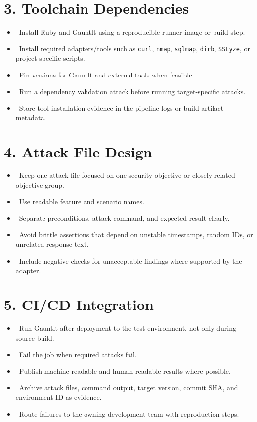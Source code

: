 \documentclass[11pt]{article}
\newcommand{\checkbox}{\raisebox{0.2ex}{\fbox{\rule{0pt}{0.9ex}\rule{0.9ex}{0pt}}}}
\begin{document}
\section{3. Toolchain Dependencies}
\begin{itemize}
  \item \checkbox\ Install Ruby and Gauntlt using a reproducible runner image or build step.
  \item \checkbox\ Install required adapters/tools such as \texttt{curl}, \texttt{nmap}, \texttt{sqlmap}, \texttt{dirb}, \texttt{SSLyze}, or project-specific scripts.
  \item \checkbox\ Pin versions for Gauntlt and external tools when feasible.
  \item \checkbox\ Run a dependency validation attack before running target-specific attacks.
  \item \checkbox\ Store tool installation evidence in the pipeline logs or build artifact metadata.
\end{itemize}

\section{4. Attack File Design}
\begin{itemize}
  \item \checkbox\ Keep one attack file focused on one security objective or closely related objective group.
  \item \checkbox\ Use readable feature and scenario names.
  \item \checkbox\ Separate preconditions, attack command, and expected result clearly.
  \item \checkbox\ Avoid brittle assertions that depend on unstable timestamps, random IDs, or unrelated response text.
  \item \checkbox\ Include negative checks for unacceptable findings where supported by the adapter.
\end{itemize}

\section{5. CI/CD Integration}
\begin{itemize}
  \item \checkbox\ Run Gauntlt after deployment to the test environment, not only during source build.
  \item \checkbox\ Fail the job when required attacks fail.
  \item \checkbox\ Publish machine-readable and human-readable results where possible.
  \item \checkbox\ Archive attack files, command output, target version, commit SHA, and environment ID as evidence.
  \item \checkbox\ Route failures to the owning development team with reproduction steps.
\end{itemize}
\end{document}
